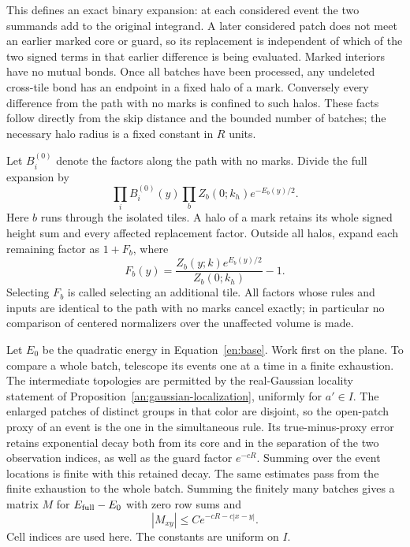 This defines an exact binary expansion: at each considered event the
two summands add to the original integrand.  A later considered patch
does not meet an earlier marked core or guard, so its replacement is
independent of which of the two signed terms in that earlier difference
is being evaluated.  Marked interiors have no mutual bonds.  Once all
batches have been processed, any undeleted cross-tile bond has an
endpoint in a fixed halo of a mark.  Conversely every difference from
the path with no marks is confined to such halos.  These facts follow
directly from the skip distance and the bounded number of batches;
the necessary halo radius is a fixed constant in $R$ units.

Let $B_i^{(0)}$ denote the factors along the path with no marks.  Divide
the full expansion by
\begin{equation}\label{en:base}
       \prod_iB_i^{(0)}(y)
       \prod_b Z_b(0;k_h)e^{-E_b(y)/2}.
\end{equation}
Here $b$ runs through the isolated tiles.  A halo of a mark retains its
whole signed height sum and every affected replacement factor.
Outside all halos, expand each remaining factor as $1+F_b$, where
\begin{equation}\label{en:tile-error}
            F_b(y)=\frac{Z_b(y;k)e^{E_b(y)/2}}{Z_b(0;k_h)}-1.
\end{equation}
Selecting $F_b$ is called selecting an additional tile.  All factors
whose rules and inputs are identical to the path with no marks cancel
exactly; in particular no comparison of centered normalizers over the
unaffected volume is made.

Let $E_0$ be the quadratic energy in Equation~\eqref{en:base}.
Work first on the plane.  To compare a whole batch, telescope its
events one at a time in a finite exhaustion.  The intermediate
topologies are permitted by the real-Gaussian locality statement
of Proposition~\ref{an:gaussian-localization}, uniformly for $a'\in I$.
The enlarged patches of distinct groups in that color are disjoint,
so the open-patch proxy of an event is the one in the simultaneous
rule.  Its true-minus-proxy error retains exponential decay both
from its core and in the separation of the two observation indices,
as well as the guard factor $e^{-cR}$.  Summing over the event
locations is finite with this retained decay.  The same estimates
pass from the finite exhaustion to the whole batch.  Summing the
finitely many batches gives a matrix $M$ for $E_{\rm full}-E_0$ with
zero row sums and
\begin{equation}\label{en:link-matrix}
 |M_{xy}|\leq C e^{-cR-c|x-y|}.
\end{equation}
Cell indices are used here.  The constants are uniform on $I$.

